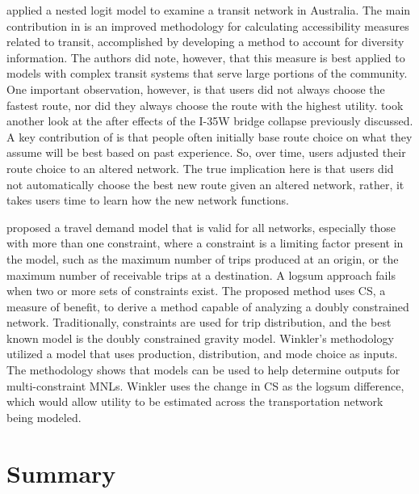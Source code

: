 \citet{Nassir2016} applied a nested logit model to examine a transit
network in Australia. The main contribution in \citet{Nassir2016} is an
improved methodology for calculating accessibility measures related to
transit, accomplished by developing a method to account for diversity
information. The authors did note, however, that this measure is best applied
to models with complex transit systems that serve large portions of the
community. One important observation, however, is that users did not always
choose the fastest route, nor did they always choose the route with the
highest utility. \citet{He2012} took another look at the after effects of
the I-35W bridge collapse previously discussed. A key contribution of
\citet{He2012} is that people often initially base route choice on what they
assume will be best based on past experience. So, over time, users
adjusted their route choice to an altered network. The true implication here
is that users did not automatically choose the best new route given an
altered network, rather, it takes users time to learn how the new network
functions.

\citet{winkler2016} proposed a travel demand model that is valid for all
networks,
especially those with more than one constraint, where a constraint is a limiting factor
present in the model, such as the maximum number of trips produced at an origin, or
the maximum number of receivable trips at a destination. A logsum approach fails when two
or more sets of constraints exist. The proposed method uses CS, a measure of benefit,
to derive a method capable of analyzing a doubly constrained network. Traditionally,
constraints are used for trip distribution, and the best known model is the doubly constrained
gravity model. Winkler’s methodology utilized a
model that uses production, distribution, and mode choice as inputs. The
methodology shows that models can be used to help determine outputs for
multi-constraint MNLs. Winkler uses the change in CS as the logsum difference, which
would allow utility to be estimated across the transportation network
being modeled.

\section{Summary}

